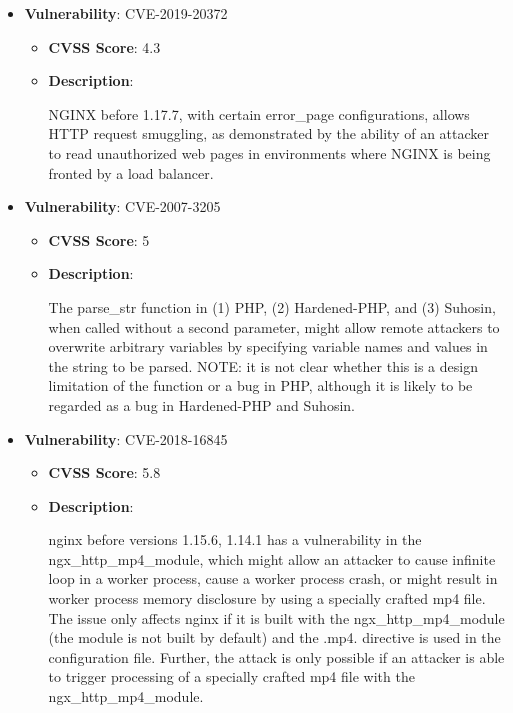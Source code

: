 \documentclass{article}
\begin{document}
\begin{itemize}
        \item \textbf{Vulnerability}: CVE-2019-20372
        \begin{itemize}
            \item \textbf{CVSS Score}:  4.3 
            \item \textbf{Description}:
            \parbox[t]{0.9\linewidth}{
                \ttfamily NGINX before 1.17.7, with certain error\_page configurations, allows HTTP request smuggling, as demonstrated by the ability of an attacker to read unauthorized web pages in environments where NGINX is being fronted by a load balancer.
            }
        \end{itemize}
    
        \item \textbf{Vulnerability}: CVE-2007-3205
        \begin{itemize}
            \item \textbf{CVSS Score}:  5 
            \item \textbf{Description}:
            \parbox[t]{0.9\linewidth}{
                \ttfamily The parse\_str function in (1) PHP, (2) Hardened-PHP, and (3) Suhosin, when called without a second parameter, might allow remote attackers to overwrite arbitrary variables by specifying variable names and values in the string to be parsed.  NOTE: it is not clear whether this is a design limitation of the function or a bug in PHP, although it is likely to be regarded as a bug in Hardened-PHP and Suhosin.
            }
        \end{itemize}
    
        \item \textbf{Vulnerability}: CVE-2018-16845
        \begin{itemize}
            \item \textbf{CVSS Score}:  5.8 
            \item \textbf{Description}:
            \parbox[t]{0.9\linewidth}{
                \ttfamily nginx before versions 1.15.6, 1.14.1 has a vulnerability in the ngx\_http\_mp4\_module, which might allow an attacker to cause infinite loop in a worker process, cause a worker process crash, or might result in worker process memory disclosure by using a specially crafted mp4 file. The issue only affects nginx if it is built with the ngx\_http\_mp4\_module (the module is not built by default) and the .mp4. directive is used in the configuration file. Further, the attack is only possible if an attacker is able to trigger processing of a specially crafted mp4 file with the ngx\_http\_mp4\_module.
            }
        \end{itemize}
    
\end{itemize}
\end{document}

